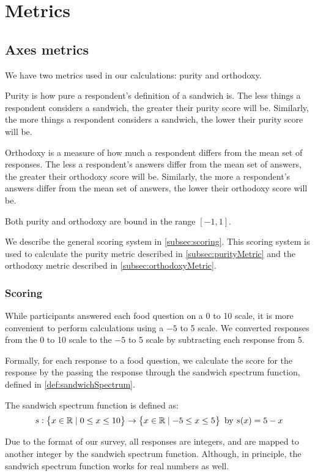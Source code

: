 \chapter{Metrics}

\section{Axes metrics}
We have two metrics used in our calculations: purity and orthodoxy.

Purity is how pure a respondent's definition of a sandwich is.
The less things a respondent considers a sandwich, the greater their purity score will be.
Similarly, the more things a respondent considers a sandwich, the lower their purity score will be.

Orthodoxy is a measure of how much a respondent differs from the mean set of responses.
The less a respondent's answers differ from the mean set of answers, the greater their orthodoxy score will be.
Similarly, the more a respondent's answers differ from the mean set of answers, the lower their orthodoxy score will be.

Both purity and orthodoxy are bound in the range $[-1, 1]$.

We describe the general scoring system in \vref{subsec:scoring}.
This scoring system is used to calculate the purity metric described in \vref{subsec:purityMetric} and the orthodoxy metric described in \vref{subsec:orthodoxyMetric}.

\subsection{Scoring}\label{subsec:scoring}
While participants answered each food question on a 0 to 10 scale, it is more convenient to perform calculations using a $-5$ to 5 scale.
We converted responses from the 0 to 10 scale to the $-5$ to 5 scale by subtracting each response from 5.

Formally, for each response to a food question, we calculate the score for the response by the passing the response through the sandwich spectrum function, defined in \vref{def:sandwichSpectrum}.

\begin{definition}\label{def:sandwichSpectrum}
	The sandwich spectrum function is defined as:
	\begin{equation}
		s : \set{x \in \mathbb{R}\mid0 \leq x \leq 10} \to \set{x \in \mathbb{R}\mid-5 \leq x \leq 5}\ \text{by}\ s(x) = 5 - x
	\end{equation}
\end{definition}
Due to the format of our survey, all responses are integers, and are mapped to another integer by the sandwich spectrum function.
Although, in principle, the sandwich spectrum function works for real numbers as well.

